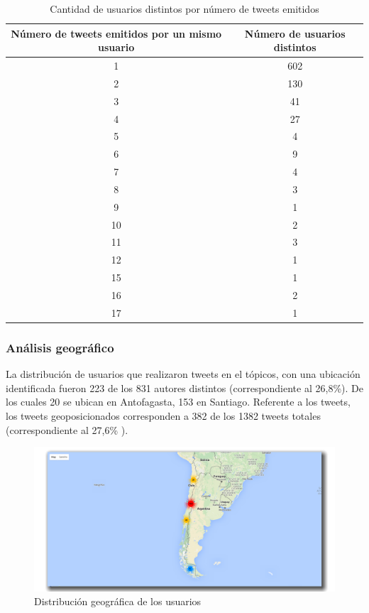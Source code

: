 \begin{table}[H]
	\centering
	\begin{tabular}{| c | c |}
		\hline
		\multicolumn{1}{|p{3cm}|}{Número de tweets emitidos por un mismo usuario} & \multicolumn{1}{p{3cm}|}{Número de usuarios  distintos} \\ \hline
		1 & 602 \\ \hline
		2 & 130 \\ \hline
		3 & 41  \\ \hline
		4 & 27 \\ \hline
		5 & 4  \\ \hline
		6 & 9  \\ \hline
		7 & 4  \\ \hline
		8 & 3  \\ \hline
		9 & 1  \\ \hline
		10 & 2  \\ \hline
		11 & 3  \\ \hline
		12 & 1  \\ \hline
		15 & 1  \\ \hline
		16 & 2  \\ \hline
		17 & 1  \\ \hline
	\end{tabular}
	\caption {Cantidad de usuarios distintos por número de tweets emitidos}
\end{table}

\subsubsection{Análisis geográfico}

La distribución de usuarios que realizaron tweets en el tópicos, con una ubicación 
identificada fueron 223 de los 831 autores distintos (correspondiente al 26,8\%). De los cuales 20 se ubican en Antofagasta, 153 en Santiago. Referente a los tweets, los tweets geoposicionados corresponden a 382 de los 1382 tweets totales (correspondiente al 27,6\% ).

\begin{figure}[H]
	\centering
	\includegraphics[width=1\textwidth]{imgs/213_usuarios_mapa.png}
	\caption{Distribución geográfica de los usuarios}
	\label{fig:geo_usuarios_213}
\end{figure}

